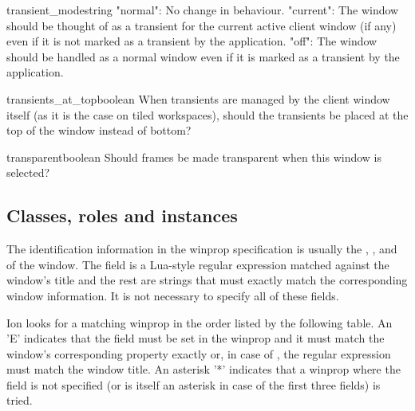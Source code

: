         
\begin{winprop}{transient_mode}{string}
    "normal": No change in behaviour. "current": The window
    should be thought of as a transient for the current active
    client window (if any) even if it is not marked as a
    transient by the application. "off": The window should be
    handled as a normal window even if it is marked as a
    transient by the application. 
\end{winprop}


\begin{winprop}{transients_at_top}{boolean}
    When transients are managed by the client window itself (as it
    is the case on tiled workspaces), should the transients be
    placed at the top of the window instead of bottom? 
\end{winprop}


\begin{winprop}{transparent}{boolean}
    Should frames be made transparent when this window is selected? \\
\end{winprop}



\subsection{Classes, roles and instances}
\label{sec:classesrolesinstances}

The identification information in the winprop specification is usually the
,
,
 and
of the window. The  field is a Lua-style regular expression
matched against the window's title and the rest are strings that must
exactly match the corresponding window information. It is not necessary
to specify all of these fields.

Ion looks for a matching winprop in the order listed by the following
table. An 'E' indicates that the field must be set in the winprop
and it must match the window's corresponding property exactly or, in
case of , the regular expression must match the window
title. An asterisk '*' indicates that a winprop where the field is
not specified (or is itself an asterisk in case of the first three
fields) is tried.

